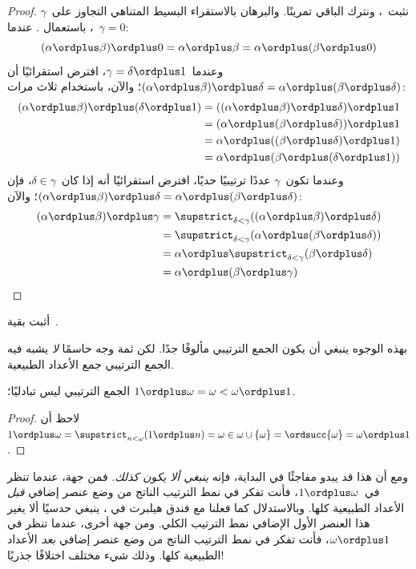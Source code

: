 \documentclass[../../../include/open-logic-section]{subfiles}
\begin{document}
\begin{proof}
نثبت~، ونترك الباقي تمرينًا. والبرهان بالاستقراء
البسيط المتناهي التجاوز على~$\gamma$، باستعمال
. عندما~$\gamma = 0$:
\[
(\alpha \ordplus  \beta) \ordplus  0 = \alpha \ordplus  \beta  = \alpha \ordplus  (\beta \ordplus  0)
\]
وعندما~$\gamma = \delta\ordplus 1$، افترض استقرائيًا أن
$(\alpha \ordplus  \beta) \ordplus  \delta =
\alpha \ordplus  (\beta \ordplus \delta)$؛ والآن، باستخدام
 ثلاث مرات:
\begin{align*}
	(\alpha \ordplus  \beta) \ordplus  (\delta \ordplus  1) & = ((\alpha \ordplus  \beta) \ordplus  \delta)\ordplus 1\\
	& = (\alpha \ordplus  (\beta \ordplus  \delta)) \ordplus  1\\
	& = \alpha \ordplus  ((\beta \ordplus  \delta)\ordplus 1)\\
	& = \alpha \ordplus  (\beta \ordplus  (\delta\ordplus 1))
\end{align*}	
وعندما تكون~$\gamma$ عددًا ترتيبيًا حديًا، افترض استقرائيًا أنه إذا
كان~$\delta \in \gamma$، فإن
$(\alpha \ordplus  \beta) \ordplus  \delta =
\alpha \ordplus  (\beta \ordplus  \delta)$؛ والآن:
\begin{align*}
	(\alpha \ordplus  \beta) \ordplus  \gamma & = \supstrict_{\delta < \gamma}((\alpha \ordplus  \beta) \ordplus  \delta) \\
	&= \supstrict_{\delta < \gamma}(\alpha \ordplus  (\beta \ordplus  \delta))\\
	&= \alpha \ordplus  \supstrict_{\delta < \gamma}(\beta \ordplus  \delta)\\
	& = \alpha \ordplus  (\beta \ordplus  \gamma)
\end{align*}
\end{proof}

\begin{prob}
أثبت بقية~.
\end{prob}

بهذه الوجوه ينبغي أن يكون الجمع الترتيبي مألوفًا جدًا. لكن ثمة وجه
حاسمًا \emph{لا} يشبه فيه الجمع الترتيبي جمع الأعداد الطبيعية.

\begin{prop}
الجمع الترتيبي {ليس} تبادليًا؛
$1 \ordplus \omega = \omega < \omega \ordplus 1$.
\end{prop}

\begin{proof}
لاحظ أن~$1 \ordplus \omega = \supstrict_{n < \omega} (1 \ordplus n)
= \omega \in \omega \cup \{\omega\} = \ordsucc{\omega} = \omega
\ordplus 1$.
\end{proof}
\noindent
ومع أن هذا قد يبدو مفاجئًا في البداية، فإنه \emph{ينبغي ألا يكون
كذلك}. فمن جهة، عندما تنظر في~$1 \ordplus \omega$، فأنت تفكر في نمط
الترتيب الناتج من وضع عنصر إضافي \emph{قبل} الأعداد الطبيعية كلها.
وبالاستدلال كما فعلنا مع فندق هيلبرت في
، ينبغي حدسيًا ألا يغير هذا العنصر
الأول الإضافي نمط الترتيب الكلي. ومن جهة أخرى، عندما تنظر في
$\omega \ordplus 1$، فأنت تفكر في نمط الترتيب الناتج من وضع عنصر
إضافي \emph{بعد} الأعداد الطبيعية كلها. وذلك شيء مختلف اختلافًا
جذريًا!
\end{document}
